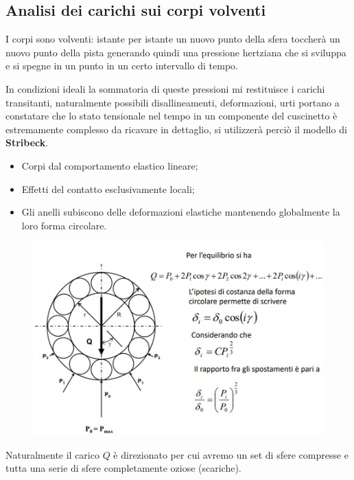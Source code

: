 \documentclass[a4paper, 15pt]{article}
\begin{document}
			\subsection{Analisi dei carichi sui corpi volventi}
			I corpi sono volventi: istante per istante un nuovo punto della sfera toccherà un nuovo punto della pista generando quindi una pressione hertziana che si sviluppa e si spegne in un punto in un certo intervallo di tempo. \newline
			
			In condizioni ideali la sommatoria di queste pressioni mi restituisce i carichi transitanti, naturalmente possibili disallineamenti, deformazioni, urti portano a constatare che lo stato tensionale nel tempo in un componente del cuscinetto è estremamente complesso da ricavare in dettaglio, si utilizzerà perciò il modello di \textbf{Stribeck}. 
			
			\begin{itemize}
				\item Corpi dal comportamento elastico lineare; 
				\item Effetti del contatto esclusivamente locali;
				\item Gli anelli subiscono delle deformazioni elastiche mantenendo globalmente la loro forma circolare. 
			\end{itemize}
			\begin{figure}[H]
				\centering
				\includegraphics[width=0.8\linewidth]{immagini/screenshot016}
				\label{fig:screenshot016}
			\end{figure}
			Naturalmente il carico $Q$ è direzionato per cui avremo un set di sfere compresse e tutta una serie di sfere completamente oziose (scariche). 
			
\end{document}
